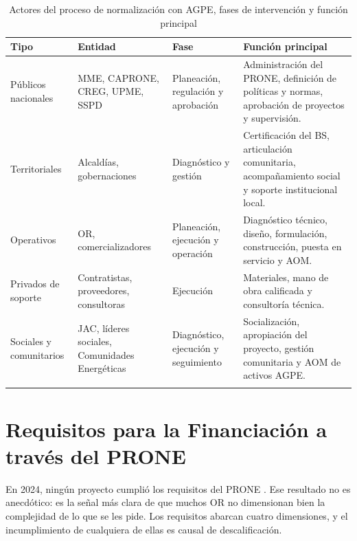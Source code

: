 \begin{table}[H]
\centering
\caption{Actores del proceso de normalización con AGPE, fases de intervención y función principal}
\label{tab:actores_roles}
\begin{tabularx}{\textwidth}{>{\RaggedRight}p{2.2cm}
                             >{\RaggedRight}p{3.8cm}
                             >{\RaggedRight}p{2.8cm}
                             >{\RaggedRight\arraybackslash}X}
\toprule
\textbf{Tipo} & \textbf{Entidad} & \textbf{Fase} & \textbf{Función principal} \\
\midrule
\rowcolor{grisclaro}
Públicos nacionales & MME, CAPRONE, CREG, UPME, SSPD & Planeación, regulación y aprobación & Administración del PRONE, definición de políticas y normas, aprobación de proyectos y supervisión. \\
Territoriales & Alcaldías, gobernaciones & Diagnóstico y gestión & Certificación del BS, articulación comunitaria, acompañamiento social y soporte institucional local. \\
\rowcolor{grisclaro}
Operativos & OR, comercializadores & Planeación, ejecución y operación & Diagnóstico técnico, diseño, formulación, construcción, puesta en servicio y AOM. \\
Privados de soporte & Contratistas, proveedores, consultoras & Ejecución & Materiales, mano de obra calificada y consultoría técnica. \\
\rowcolor{grisclaro}
Sociales y comunitarios & JAC, líderes sociales, Comunidades Energéticas & Diagnóstico, ejecución y seguimiento & Socialización, apropiación del proyecto, gestión comunitaria y AOM de activos AGPE. \\
\bottomrule
\multicolumn{4}{l}{\footnotesize\textit{Fuente: Elaboración propia.}}
\end{tabularx}
\end{table}


\section{Requisitos para la Financiación a través del PRONE}
\label{sec:requisitos}

En 2024, ningún proyecto cumplió los requisitos del PRONE
\parencite{MME2025}. Ese resultado no es anecdótico: es la señal más
clara de que muchos OR no dimensionan bien la complejidad de lo que se
les pide. Los requisitos abarcan cuatro dimensiones, y el incumplimiento
de cualquiera de ellas es causal de descalificación.

